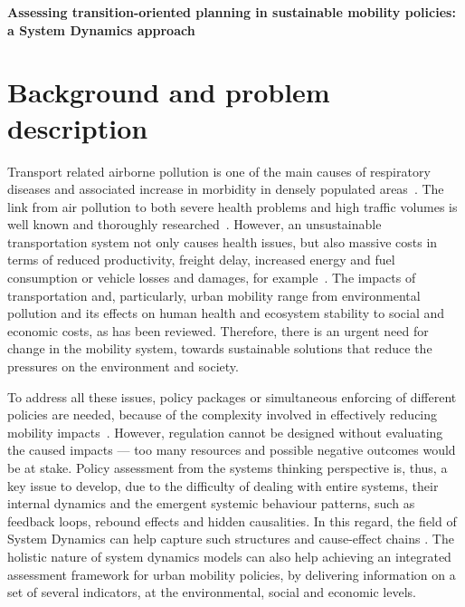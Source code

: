 \documentclass[a4paper,fontsize=11pt,bibliography=totoc]{scrartcl}
\newcommand{\titlemake}[2]{%
		\begin{center}
			\parbox{#1\linewidth}{\centering\Large\sffamily\bfseries{#2}}
		\end{center}
}
\begin{document}
\pagestyle{fancy}
\fancyhf{} %
\rhead{\footnotesize \today}
\rfoot{\footnotesize \thepage}

\titlemake{0.9}{ %
Assessing transition-oriented planning in sustainable mobility policies: a System Dynamics approach
}

\section{Background and problem description}
\label{s:background}
Transport related airborne pollution is one of the main causes of respiratory diseases and associated increase in morbidity in densely populated areas~\parencite{vimercati2011_Trafficrelatedair,who2006_Airqualityguidelines}. The link from air pollution to both severe health problems and high traffic volumes is well known and thoroughly researched~\parencite{who2006_Airqualityguidelines}. However, an unsustainable transportation system not only causes health issues, but also massive costs in terms of reduced productivity, freight delay, increased energy and fuel consumption or vehicle losses and damages, for example~\parencite{li-zeng2012_SocialCostTraffic}. The impacts of transportation and, particularly, urban mobility range from environmental pollution and its effects on human health and ecosystem stability to social and economic costs, as has been reviewed. Therefore, there is an urgent need for change in the mobility system, towards sustainable solutions that reduce the pressures on the environment and society.

To address all these issues, policy packages or simultaneous enforcing of different policies are needed, because of the complexity involved in effectively reducing mobility impacts~\parencite[ch. 3, p. 45]{garciasierra2014_Travelbehaviourenvironmental}. However, regulation cannot be designed without evaluating the caused impacts --- too many resources and possible negative outcomes would be at stake. Policy assessment from the systems thinking perspective is, thus, a key issue to develop, due to the difficulty of dealing with entire systems, their internal dynamics and the emergent systemic behaviour patterns, such as feedback loops, rebound effects and hidden causalities. In this regard, the field of System Dynamics can help capture such structures and cause-effect chains \parencite{hjorth2006_Navigatingtowardssustainable}. The holistic nature of system dynamics models can also help achieving an integrated assessment framework for urban mobility policies, by delivering information on a set of several indicators, at the environmental, social and economic levels.
\end{document}
